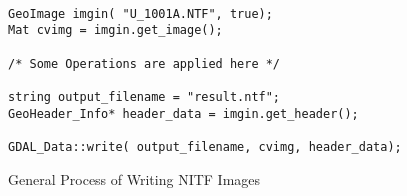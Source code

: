 \documentclass[10pt]{report}
\begin{document}
\begin{figure}[!h]
\begin{verbatim}

GeoImage imgin( "U_1001A.NTF", true);
Mat cvimg = imgin.get_image();

/* Some Operations are applied here */

string output_filename = "result.ntf";
GeoHeader_Info* header_data = imgin.get_header();

GDAL_Data::write( output_filename, cvimg, header_data);

\end{verbatim}
\caption{General Process of Writing NITF Images}
\label{fig::gdal_data01}
\end{figure}
\end{document}
